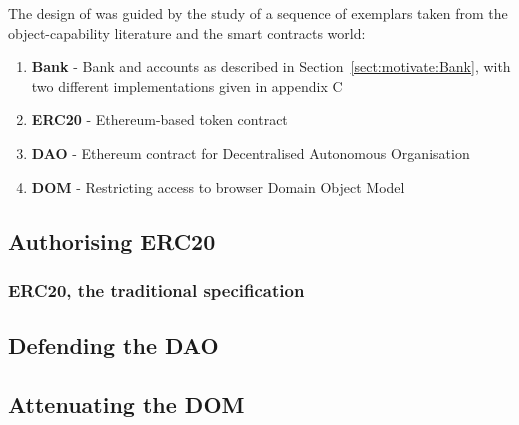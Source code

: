 


The design of \Chainmail was guided by the study of a sequence of
exemplars taken from the object-capability literature and the smart
contracts world:

\begin{enumerate}
\item \textbf{Bank} \cite{arnd18} - Bank and accounts as described in
Section~\ref{sect:motivate:Bank}, with two different implementations given in appendix C
\item
\textbf{ERC20} \cite{ERC20} - Ethereum-based token contract
\item
\textbf{DAO} \cite{Dao,DaoBug} - Ethereum contract for Decentralised Autonomous
Organisation
\item
\textbf{DOM} \cite{dd,ddd} - Restricting access to browser Domain Object Model\\
\end{enumerate}\vspace{-1em}

\subsection{Authorising ERC20}
\label{sect:example:ERC20}
{}

\subsubsection{ERC20, the traditional specification}
\label{ERC20:appendix}


\subsection{Defending the DAO}
\label{Dao:appendix}


\subsection{Attenuating the DOM}
\label{sect:example:DOM}





